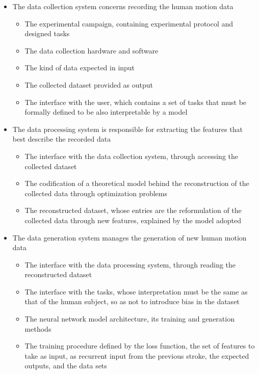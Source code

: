 \documentclass[12pt]{report}
\begin{document}
\begin{itemize}
    \item The data collection system concerns recording the human motion data
    \begin{itemize}
        \item The experimental campaign, containing experimental protocol and designed tasks
        \item The data collection hardware and software
        \item The kind of data expected in input
        \item The collected dataset provided as output
        \item The interface with the user, which contains a set of tasks that must be formally defined to be also interpretable by a model
    \end{itemize}
    \item The data processing system is responsible for extracting the features that best describe the recorded data
    \begin{itemize}
        \item The interface with the data collection system, through accessing the collected dataset
        \item The codification of a theoretical model behind the reconstruction of the collected data through optimization problems
        \item The reconstructed dataset, whose entries are the reformulation of the collected data through new features, explained by the model adopted
    \end{itemize}
    \item The data generation system manages the generation of new human motion data
    \begin{itemize}
        \item The interface with the data processing system, through reading the reconstructed dataset
        \item The interface with the tasks, whose interpretation must be the same as that of the human subject, so as not to introduce bias in the dataset
        \item The neural network model architecture, its training and generation methods
        \item The training procedure defined by the loss function, the set of features to take as input, as recurrent input from the previous stroke, the expected outputs, and the data sets
    \end{itemize}
\end{itemize}
\end{document}
